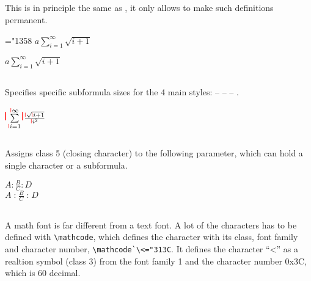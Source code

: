 \begin{table}[htb]
\subsection{}
This is in principle the same as , 
it only allows to make such definitions permanent.  

\begin{LTXexample}[width=0.25\linewidth]
\bgroup
\mathchardef\sum="1358
$a\sum\limits_{i=1}^{\infty}\sqrt{i+1}$\\[5pt]
\egroup
 
$a\sum\limits_{i=1}^{\infty}\sqrt{i+1}$ 
\end{LTXexample}


\subsection{}
Specifies specific subformula sizes for the 4 main styles: 
 --  --
 -- .

\begin{LTXexample}[width=0.15\linewidth]
\Large
\def\myRule{{%
  \color{red}%
  \mathchoice{\rule{2pt}{20pt}}{\rule{1pt}{10pt}}%
    {\rule{0.5pt}{5pt}}{\rule{0.25pt}{2.5pt}}%
    \mkern2mu}}
$\myRule\sum\limits_{\myRule i=1}^{\myRule\infty}%
 \myRule\frac{\myRule\sqrt{\myRule i+1}}{\myRule i^2}$
\end{LTXexample}

\subsection{}\label{subsec:mathclose}
Assigns class 5 (closing character) to the following 
parameter, which can hold a single character or a subformula.

\begin{LTXexample}[width=0.2\linewidth]
{\large
$A:\frac{B}{C}:D$\\[5pt]
$A\mathopen:\frac{B}{C}\mathclose: D $}
\end{LTXexample}


\subsection{}
A math font is far different from a text font. A lot of the characters has to be defined with 
\verb+\mathcode+, which defines the character with its class, font family and character number, \eg
\verb+\mathcode`\<="313C+. It defines the character ``<''{} as a realtion symbol (class 3) from
the font family 1 and the character number 0x3C, which is 60 decimal.


\end{table}

